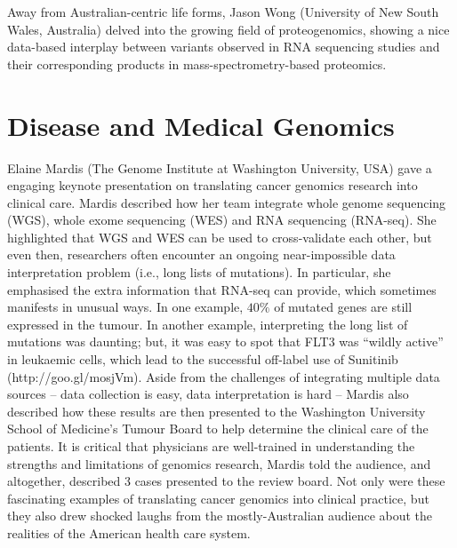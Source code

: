 \documentclass[twocolumn]{bmcart}%
\begin{document}
Away from Australian-centric life forms, Jason Wong (University of New South Wales, Australia) delved into the growing field of proteogenomics, showing a nice data-based interplay between variants observed in RNA sequencing studies and their corresponding products in mass-spectrometry-based proteomics.



\section*{Disease and Medical Genomics}
Elaine Mardis (The Genome Institute at Washington University, USA) gave a engaging keynote presentation on translating cancer genomics research into clinical care. Mardis described how her team integrate whole genome sequencing (WGS), whole exome sequencing (WES) and RNA sequencing (RNA-seq).  She highlighted that WGS and WES can be used to cross-validate each other, but even then, researchers often encounter an ongoing near-impossible data interpretation problem (i.e., long lists of mutations).  In particular, she emphasised the extra information that RNA-seq can provide, which sometimes manifests in unusual ways.  In one example, $40\%$ of mutated genes are still expressed in the tumour.  In another example, interpreting the long list of mutations was daunting; but, it was easy to spot that FLT3 was ``wildly active'' in leukaemic cells, which lead to the successful off-label use of Sunitinib (http://goo.gl/mosjVm).  Aside from the challenges of integrating multiple data sources -- data collection is easy, data interpretation is hard -- Mardis also described how these results are then presented to the Washington University School of Medicine's Tumour Board to help determine the clinical care of the patients. It is critical that physicians are well-trained in understanding the strengths and limitations of genomics research, Mardis told the audience, and altogether, described 3 cases presented to the review board. Not only were these fascinating examples of translating cancer genomics into clinical practice, but they also drew shocked laughs from the mostly-Australian audience about the realities of the American health care system.

\end{document}
